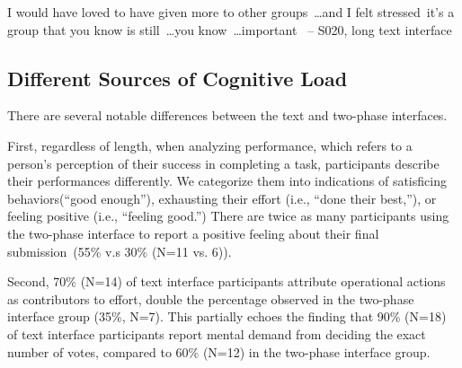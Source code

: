 \begin{displayquote}
I would have loved to have given more to other groups~\ldots and I felt stressed~\bracketellipsis it's a group that you know is still~\ldots you know~\ldots important~\bracketellipsis
\noindent \hfill -- S020, long text interface
\end{displayquote}


\subsection{Different Sources of Cognitive Load}
There are several notable differences between the text and two-phase interfaces. 

First, regardless of length, when analyzing performance, which refers to a person's perception of their success in completing a task, participants describe their performances differently. We categorize them into indications of satisficing behaviors(``good enough''), exhausting their effort (i.e., ``done their best,''), or feeling positive (i.e., ``feeling good.'') There are twice as many participants using the two-phase interface to report a positive feeling about their final submission~(55\% v.s 30\% (N=11 vs. 6)).

Second, 70\% (N=14) of text interface participants attribute operational actions as contributors to effort, double the percentage observed in the two-phase interface group (35\%, N=7). This partially echoes the finding that 90\% (N=18) of text interface participants report mental demand from deciding the exact number of votes, compared to 60\% (N=12) in the two-phase interface group.


